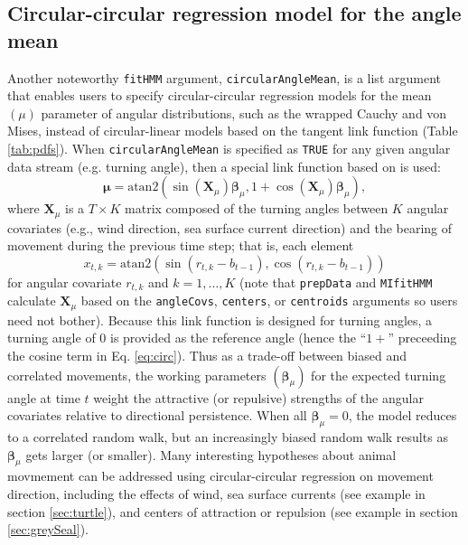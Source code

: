 \documentclass[12pt]{article}\usepackage[]{graphicx}\usepackage[]{color}
\begin{document}
\subsection{Circular-circular regression model for the angle mean}
\label{sec:circ}
Another noteworthy \verb|fitHMM| argument, \verb|circularAngleMean|, is a list argument that enables users to specify circular-circular regression models for the mean $(\mu)$ parameter of angular distributions, such as the wrapped Cauchy and von Mises, instead of circular-linear models based on the tangent link function (Table \ref{tab:pdfs}). When \verb|circularAngleMean| is specified as \verb|TRUE| for any given angular data stream (e.g. turning angle), then a special link function based on \cite{RivestEtAl2016} is used:
\begin{equation}
  {\boldsymbol \mu}=\text{atan2}(\sin({\mathbf X}_\mu){\boldsymbol \beta}_\mu,1+\cos({\mathbf X}_\mu){\boldsymbol \beta}_\mu),
  \label{eq:circ}
\end{equation}
where ${\mathbf X}_\mu$ is a $T \times K$ matrix composed of the turning angles between $K$ angular covariates (e.g., wind direction, sea surface current direction) and the bearing of movement during the previous time step; that is, each element 
\begin{equation}
x_{t,k}=\text{atan2}(\sin(r_{t,k}-b_{t-1}),\cos(r_{t,k}-b_{t-1})) 
  \label{eq:angleCov}
\end{equation}
for angular covariate $r_{t,k}$ and $k=1,\ldots,K$ (note that \verb|prepData| and \verb|MIfitHMM| calculate ${\mathbf X}_\mu$ based on the \verb|angleCovs|, \verb|centers|, or \verb|centroids| arguments so users need not bother). Because this link function is designed for turning angles, a turning angle of 0 is provided as the reference angle (hence the ``$1+$'' preceeding the cosine term in Eq. \ref{eq:circ}).  Thus as a trade-off between biased and correlated movements, the working parameters $({\boldsymbol \beta}_\mu)$ for the expected turning angle at time $t$ weight the attractive (or repulsive) strengths of the angular covariates relative to directional persistence.  When all ${\boldsymbol \beta}_\mu=0$, the model reduces to a correlated random walk, but an increasingly biased random walk results as ${\boldsymbol \beta}_\mu$ gets larger (or smaller). Many interesting hypotheses about animal movmement can be addressed using circular-circular regression on movement direction, including the effects of wind, sea surface currents (see example in section \ref{sec:turtle}), and centers of attraction or repulsion (see example in section \ref{sec:greySeal}).
\end{document}
